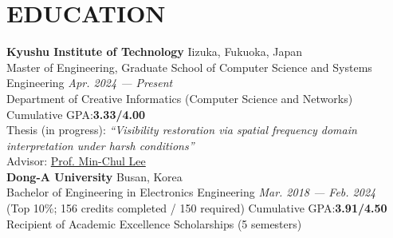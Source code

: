 \documentclass[a4paper,9pt]{extarticle}
\begin{document}
\section*{EDUCATION}
\textbf{Kyushu Institute of Technology} \hfill Iizuka, Fukuoka, Japan\\
Master of Engineering, Graduate School of Computer Science and Systems Engineering \hfill \textit{Apr. 2024 — Present} \\
Department of Creative Informatics (Computer Science and Networks)  \hfill Cumulative GPA:\textbf{3.33/4.00} \\
Thesis (in progress): \textit{“Visibility restoration via spatial frequency domain interpretation under harsh conditions”} \\
Advisor: \href{https://scholar.google.com/citations?user=9sv1-5QAAAAJ&hl=en&oi=ao}{Prof. Min-Chul Lee} \\

\noindent
\textbf{Dong-A University} \hfill Busan, Korea \\
Bachelor of Engineering in Electronics Engineering \hfill \textit{Mar. 2018 — Feb. 2024} \\
(Top 10\%; 156 credits completed / 150 required) \hfill Cumulative GPA:\textbf{3.91/4.50} \\
Recipient of Academic Excellence Scholarships (5 semesters) \\



\end{document}
